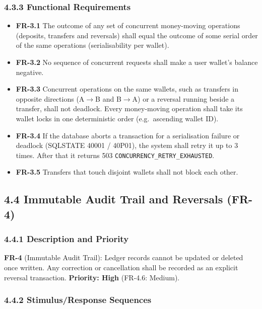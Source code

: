 \documentclass[11pt,a4paper]{article}
\providecommand{\tightlist}{\setlength{\itemsep}{2pt}\setlength{\parskip}{0pt}}
\begin{document}
\subsubsection{4.3.3 Functional Requirements}\label{functional-requirements-2}

\begin{itemize}
\tightlist
\item
  \textbf{FR-3.1} The outcome of any set of concurrent money-moving operations (deposits, transfers and
  reversals) shall equal the outcome of some serial order of the same operations (serialisability
  per wallet).
\item
  \textbf{FR-3.2} No sequence of concurrent requests shall make a user wallet's balance negative.
\item
  \textbf{FR-3.3} Concurrent operations on the same wallets, such as transfers in opposite directions
  (A\ensuremath{\rightarrow}B and B\ensuremath{\rightarrow}A) or a reversal running beside a transfer, shall not deadlock. Every money-moving
  operation shall take its wallet locks in one deterministic order (e.g.~ascending wallet ID).
\item
  \textbf{FR-3.4} If the database aborts a transaction for a serialisation failure or deadlock
  (SQLSTATE 40001 / 40P01), the system shall retry it up to 3 times. After that it returns 503
  \texttt{CONCURRENCY\_\allowbreak{}RETRY\_\allowbreak{}EXHAUSTED}.
\item
  \textbf{FR-3.5} Transfers that touch disjoint wallets shall not block each other.
\end{itemize}

\subsection{4.4 Immutable Audit Trail and Reversals (FR-4)}\label{immutable-audit-trail-and-reversals-fr-4}

\subsubsection{4.4.1 Description and Priority}\label{description-and-priority-3}

\textbf{FR-4} (Immutable Audit Trail): Ledger records cannot be updated or deleted once written. Any
correction or cancellation shall be recorded as an explicit reversal transaction.
\textbf{Priority: High} (FR-4.6: Medium).

\subsubsection{4.4.2 Stimulus/Response Sequences}\label{stimulusresponse-sequences-3}
\end{document}
